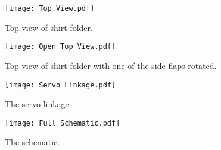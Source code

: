 \documentclass[12pt,letterpaper]{article}
\begin{document}
\begin{figure}[ht]
  \centering
    \texttt{[image: Top View.pdf]}
    \caption{Top view of shirt folder.}
    \label{topview}
\end{figure}
\begin{figure}[ht]
  \centering
    \texttt{[image: Open Top View.pdf]}
    \caption{Top view of shirt folder with one of the side flaps rotated.}
    \label{opentopview}
\end{figure}
\begin{figure}[ht]
  \centering
    \texttt{[image: Servo Linkage.pdf]}
    \caption{The servo linkage.}
    \label{servolinkage}
\end{figure}
\begin{figure}[ht]
  \centering
    \texttt{[image: Full Schematic.pdf]}
    \caption{The schematic.}
    \label{schematic}
\end{figure}
\end{document}
